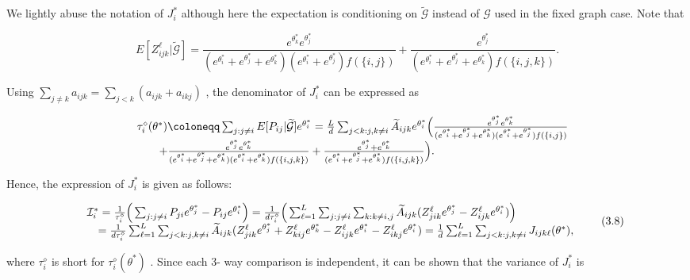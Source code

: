 We lightly abuse the notation of \(J_{i}^{*}\) although here the
expectation is conditioning on \(\widetilde{\mathcal{G}}\) instead of
\(\mathcal{G}\) used in the fixed graph case. Note that

\[
E[Z_{ijk}^{\ell}|\widetilde{\mathcal{G}} ] = \frac{e^{\theta_{k}^{*}}e^{\theta_{j}^{*}}}{(e^{\theta_{i}^{*}} + e^{\theta_{j}^{*}} + e^{\theta_{k}^{*}})(e^{\theta_{i}^{*}} + e^{\theta_{j}^{*}})f(\{i,j\})} +\frac{e^{\theta_{j}^{*}}}{(e^{\theta_{i}^{*}} + e^{\theta_{j}^{*}} + e^{\theta_{k}^{*}})f(\{i,j,k\})}.
\]

Using \(\sum_{j\neq k}a_{ijk} = \sum_{j< k}(a_{ijk} + a_{ikj})\) , the
denominator of \(J_{i}^{*}\) can be expressed as

\[
\begin{array}{r l} & {\tau_{i}^{\diamond}(\theta^{*})\coloneqq \sum_{j:j\neq i}E[P_{i j}|\widetilde{\mathcal{G}} ]e^{\theta_{i}^{*}} = \frac{L}{d}\sum_{j< k:j,k\neq i}\widetilde{A}_{i j k}e^{\theta_{i}^{*}}\Big(\frac{e^{\theta_{j}^{*}}e^{\theta_{k}^{*}}}{(e^{\theta_{i}^{*}} + e^{\theta_{j}^{*}} + e^{\theta_{k}^{*}})(e^{\theta_{i}^{*}} + e^{\theta_{j}^{*}})f(\{i,j\})}}\\ & {\qquad +\frac{e^{\theta_{j}^{*}}e^{\theta_{k}^{*}}}{(e^{\theta_{i}^{*}} + e^{\theta_{j}^{*}} + e^{\theta_{k}^{*}})(e^{\theta_{i}^{*}} + e^{\theta_{k}^{*}})f(\{i,j,k\})} +\frac{e^{\theta_{j}^{*}} + e^{\theta_{k}^{*}}}{(e^{\theta_{i}^{*}} + e^{\theta_{j}^{*}} + e^{\theta_{k}^{*}})f(\{i,j,k\})}\Big).} \end{array}
\]

Hence, the expression of \(J_{i}^{*}\) is given as follows:

\[
\begin{array}{r l} & {\mathcal{I}_{i}^{*} = \frac{1}{\tau_{i}^{\diamond}}\Big(\sum_{j:j\neq i}P_{j i}e^{\theta_{j}^{*}} - P_{i j}e^{\theta_{i}^{*}}\Big) = \frac{1}{d\tau_{i}^{\diamond}}\Big(\sum_{\ell = 1}^{L}\sum_{j:j\neq i}\sum_{k:k\neq i,j}\widetilde{A}_{i j k}(Z_{j i k}^{\ell}e^{\theta_{j}^{*}} - Z_{i j k}^{\ell}e^{\theta_{i}^{*}})\Big)}\\ & {\quad = \frac{1}{d\tau_{i}^{\diamond}}\sum_{\ell = 1}^{L}\sum_{j< k:j,k\neq i}\widetilde{A}_{i j k}(Z_{j i k}^{\ell}e^{\theta_{j}^{*}} + Z_{k i j}^{\ell}e^{\theta_{k}^{*}} - Z_{i j k}^{\ell}e^{\theta_{i}^{*}} - Z_{i k j}^{\ell}e^{\theta_{i}^{*}}) = \frac{1}{d}\sum_{\ell = 1}^{L}\sum_{j< k:j,k\neq i}J_{i j k\ell}(\theta^{*}),} \end{array} \tag{3.8}
\]

where \(\tau_{i}^{\diamond}\) is short for
\(\tau_{i}^{\diamond}(\theta^{*})\) . Since each 3- way comparison is
independent, it can be shown that the variance of \(J_{i}^{*}\) is

